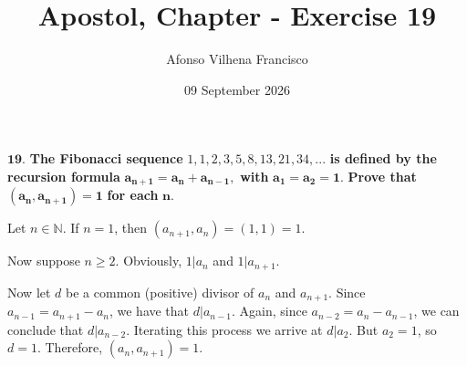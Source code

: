 \documentclass{article}
\title{Apostol, Chapter - Exercise 19}
\author{Afonso Vilhena Francisco}
\date{09 September 2026}
\begin{document}
\maketitle

$\mathbf{19.}$ \textbf{The Fibonacci sequence} $1,1,2,3,5,8,13,21,34,...$ \textbf{is defined by the recursion formula} $\mathbf{a_{n+1}=a_n+a_{n-1}},$ \textbf{with} $\mathbf{a_1=a_2=1.}$ \textbf{Prove that} $\mathbf{(a_n,a_{n+1})=1}$ \textbf{for each} $\mathbf{n}$.

\vspace{0.5cm}
Let $n \in \mathbb{N}$. If $n=1$, then $(a_{n+1},a_n)=(1,1)=1$.

Now suppose $n \geq 2$. Obviously, $1|a_n$ and $1|a_{n+1}$.

Now let $d$ be a common (positive) divisor of $a_n$ and $a_{n+1}.$ Since $a_{n-1}=a_{n+1}-a_n$, we have that $d|a_{n-1}$. Again, since $a_{n-2}=a_n-a_{n-1}$, we can conclude that $d|a_{n-2}$. Iterating this process we arrive at $d|a_2$. But $a_2=1$, so $d=1$. Therefore, $(a_n, a_{n+1})=1.$
\end{document}
